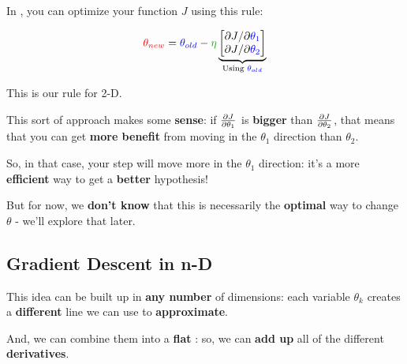         \begin{kequation}
            In , you can optimize your function $J$ using this rule:
            
            \begin{equation*}
                \red{ \theta_{new} } =  \blu{ \theta_{old} } 
                - \grn{ \eta } 
                \underbrace{
                    \begin{bmatrix}
                          \pderivslash{J}{ \blu{\theta_1} } \\ 
                          \pderivslash{J}{ \blu{\theta_2} } 
                    \end{bmatrix}
                }_{ \text{Using } \blu{ \theta_{old} } }
            \end{equation*}
            
            This is our  rule for 2-D.
        \end{kequation}
        
        This sort of approach makes some \textbf{sense}: if $\frac{\partial J}{\partial \theta_1}$ is \textbf{bigger} than $\frac{\partial J}{\partial \theta_2}$, that means that you can get \textbf{more benefit} from moving in the $\theta_1$ direction than $\theta_2$.
        
        So, in that case, your step will move more in the $\theta_1$ direction: it's a more \textbf{efficient} way to get a \textbf{better} hypothesis!
        
        But for now, we \textbf{don't know} that this is necessarily the \textbf{optimal} way to change $\theta$ - we'll explore that later.
            
        
        
    \subsection{Gradient Descent in n-D}
    
        This idea can be built up in \textbf{any number} of dimensions: each variable $\theta_k$ creates a \textbf{different} line we can use to \textbf{approximate}.
        
        And, we can combine them into a \textbf{flat} 
        : so, we can \textbf{add up} all of the different \textbf{derivatives}.
            \\
        
